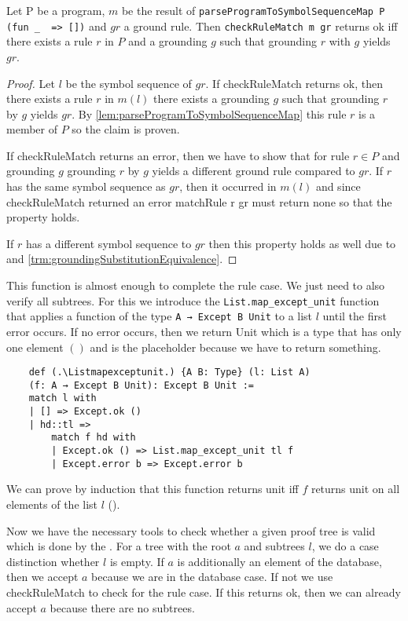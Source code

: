 \begin{lemma}[\checkRuleMatchOkIffExistsRuleForGroundRule]
    Let P be a program, $m$ be the result of \lstinline|parseProgramToSymbolSequenceMap P (fun _  => [])| and $gr$ a ground rule. Then \lstinline|checkRuleMatch m gr| returns ok iff there exists a rule $r$ in $P$ and a grounding $g$ such that grounding $r$ with $g$ yields $gr$.
\end{lemma}
\begin{proof}
    Let $l$ be the symbol sequence of $gr$. If checkRuleMatch returns ok, then there exists a rule $r$ in $m(l)$ there exists a grounding $g$ such that grounding $r$ by $g$ yields $gr$. By \cref{lem:parseProgramToSymbolSequenceMap} this rule $r$ is a member of $P$ so the claim is proven.

    If checkRuleMatch returns an error, then we have to show that for rule $r \in P$ and grounding $g$ grounding $r$ by $g$ yields a different ground rule compared to $gr$. If $r$ has the same symbol sequence as $gr$, then it occurred in $m(l)$ and since checkRuleMatch returned an error matchRule r gr must return none so that the property holds.

    If $r$ has a different symbol sequence to $gr$ then this property holds as well due to \symbolSequenceNotEq and \cref{trm:groundingSubstitutionEquivalence}.
\end{proof}

This function is almost enough to complete the rule case. We just need to also verify all subtrees. For this we introduce the \lstinline|List.map_except_unit| function that applies a function of the type \lstinline|A → Except B Unit| to a list $l$ until the first error occurs. If no error occurs, then we return Unit which is a type that has only one element $()$ and is the placeholder because we have to return something.

\begin{lstlisting}
    def (.\Listmapexceptunit.) {A B: Type} (l: List A) 
    (f: A → Except B Unit): Except B Unit :=
    match l with
    | [] => Except.ok ()
    | hd::tl =>
        match f hd with
        | Except.ok () => List.map_except_unit tl f
        | Except.error b => Except.error b
\end{lstlisting}

We can prove by induction that this function returns unit iff $f$ returns unit on all elements of the list $l$ (\ListmapexceptunitIsUnitIffAll).

Now we have the necessary tools to check whether a given proof tree is valid which is done by the \treeValidator. For a tree with the root $a$ and subtrees $l$, we do a case distinction whether $l$ is empty. If $a$ is additionally an element of the database, then we accept $a$ because we are in the database case. If not we use checkRuleMatch to check for the rule case. If this returns ok, then we can already accept $a$ because there are no subtrees.

